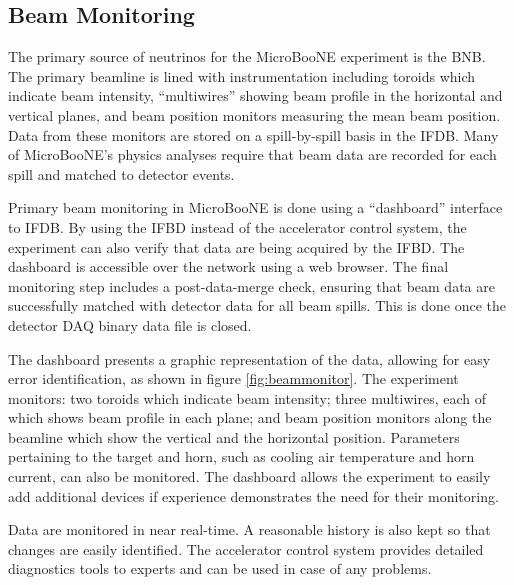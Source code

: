 \subsection{Beam Monitoring}
\label{sec:beam-monitoring}

The primary source of neutrinos for the MicroBooNE experiment is the BNB. The primary beamline is lined with instrumentation including toroids which indicate beam intensity, ``multiwires'' showing beam profile in the horizontal and vertical planes, and beam position monitors measuring the mean beam position. Data from these monitors are stored on a spill-by-spill basis in the IFDB. Many of MicroBooNE's physics analyses require that beam data are recorded for each spill and matched to detector events.

Primary beam monitoring in MicroBooNE is done using a ``dashboard'' interface to IFDB. By using the IFBD instead of the accelerator control system, the experiment can also verify that data are being acquired by the IFBD. The dashboard is accessible over the network using a web browser. The final monitoring step includes a post-data-merge check, ensuring that beam data are successfully matched with detector data for all beam spills. This is done once the detector DAQ binary data file is closed. 

The dashboard presents a graphic representation of the data, allowing for easy error identification, as shown in figure \ref{fig:beammonitor}.  The experiment monitors: two toroids which indicate beam intensity; three multiwires, each of which shows beam profile in each plane; and beam position monitors along the beamline which show the vertical and the horizontal position.  Parameters pertaining to the target and horn, such as cooling air temperature and horn current, can also be monitored.  The dashboard allows the experiment to easily add additional devices if experience demonstrates the need for their monitoring.

Data are monitored in near real-time.  A reasonable history is also kept so that changes are easily identified.  The accelerator control system provides detailed diagnostics tools to experts and can be used in case of any problems.


